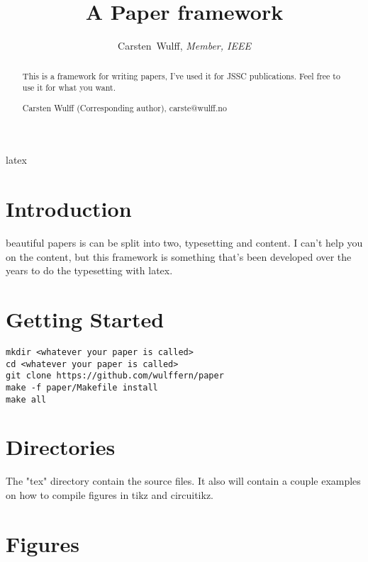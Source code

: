 





\title{A Paper framework}
%
\author{Carsten~Wulff, \textit{Member, IEEE} }

\maketitle

\begin{abstract}
This is a framework for writing papers, I've used it for JSSC publications. Feel free to use it for what you want.

Carsten Wulff (Corresponding author), carste@wulff.no

\end{abstract}
\begin{IEEEkeywords}
latex
\end{IEEEkeywords}

\section{Introduction} \label{introduction}


 beautiful papers is can be split into two, typesetting and content. I can't help you on the content, but this framework is something that's been developed over the years to do the typesetting with latex.

\section{Getting Started}

\begin{lstlisting}[frame=single,style=paperBashStyle]
mkdir <whatever your paper is called>
cd <whatever your paper is called>
git clone https://github.com/wulffern/paper
make -f paper/Makefile install
make all
\end{lstlisting}

\section{Directories}

The "tex" directory contain the source files. It also will contain a couple examples on how to compile figures in tikz and circuitikz.


\section{Figures}

